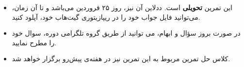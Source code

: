 \begin{tcolorbox}[colback=blue!5!white, colframe=black!75!black, title=نکات مهم در مورد تمرین ]
	
	\begin{itemize}
		\item این تمرین \textbf{تحویلی} است. ددلاین آن نیز، روز ۲۵ فروردین می‌باشد و تا آن زمان، می‌توانید فایل جواب خود را در ریپازیتوری گیت‌هاب خود، آپلود کنید.
		
		\item 
		در صورت بروز سؤال و ابهام، می توانید از طریق گروه تلگرامی دوره، سوال خود را مطرح نمایید.
		
		\item 
		کلاس حل تمرین مربوط به این تمرین نیز در هفته‌ی پیش‌رو برگزار خواهد شد.
		
	\end{itemize}

\end{tcolorbox}